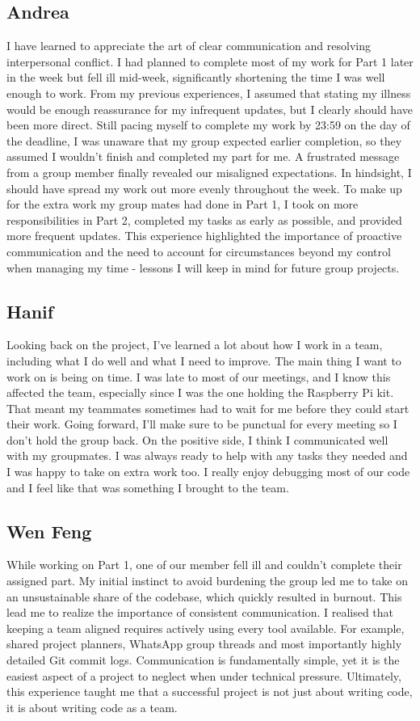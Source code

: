 \documentclass[11pt]{article}
\begin{document}
\subsection{Andrea}
I have learned to appreciate the art of clear communication and resolving interpersonal conflict. I had planned to complete most of my work for Part 1 later in the week but fell ill mid-week, significantly shortening the time I was well enough to work. From my previous experiences, I assumed that stating my illness would be enough reassurance for my infrequent updates, but I clearly should have been more direct. Still pacing myself to complete my work by 23:59 on the day of the deadline, I was unaware that my group expected earlier completion, so they assumed I wouldn't finish and completed my part for me. A frustrated message from a group member finally revealed our misaligned expectations. In hindsight, I should have spread my work out more evenly throughout the week. To make up for the extra work my group mates had done in Part 1, I took on more responsibilities in Part 2, completed my tasks as early as possible, and provided more frequent updates. This experience highlighted the importance of proactive communication and the need to account for circumstances beyond my control when managing my time - lessons I will keep in mind for future group projects.

\subsection{Hanif}
Looking back on the project, I've learned a lot about how I work in a team, including what I do well and what I need to improve. The main thing I want to work on is being on time. I was late to most of our meetings, and I know this affected the team, especially since I was the one holding the Raspberry Pi kit. That meant my teammates sometimes had to wait for me before they could start their work. Going forward, I'll make sure to be punctual for every meeting so I don't hold the group back. On the positive side, I think I communicated well with my groupmates. I was always ready to help with any tasks they needed and I was happy to take on extra work too. I really enjoy debugging most of our code and I feel like that was something I brought to the team.

\subsection{Wen Feng}
While working on Part 1, one of our member fell ill and couldn't complete their assigned part. My initial instinct to avoid burdening the group led me to take on an unsustainable share of the codebase, which quickly resulted in burnout. This lead me to realize the importance of consistent communication. I realised that keeping a team aligned requires actively using every tool available. For example, shared project planners, WhatsApp group threads and most importantly highly detailed Git commit logs. Communication is fundamentally simple, yet it is the easiest aspect of a project to neglect when under technical pressure. Ultimately, this experience taught me that a successful project is not just about writing code, it is about writing code as a team.
\end{document}
